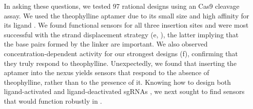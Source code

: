\documentclass[10pt,oneside]{article}
\begin{document}
In asking these questions, we tested 97 rational designs using an \invitro Cas9 cleavage assay.  We used the theophylline aptamer due to its small size and high affinity for its ligand \autocite{jenison1994}.  We found functional sensors for all three insertion sites and were most successful with the strand displacement strategy (e, ), the latter implying that the base pairs formed by the linker are important.  We also observed concentration-dependent activity for our strongest designs (f), confirming that they truly respond to theophylline.  Unexpectedly, we found that inserting the aptamer into the nexus yields sensors that respond to the absence of theophylline, rather than to the presence of it.  Knowing how to design both ligand-activated and ligand-deactivated sgRNAs \invitro{}, we next sought to find sensors that would function robustly in \ecoli{}.
% 
% 
% 
%
% 
% 
% 
% 
% 
%
% 
% 
% 
%

\end{document}
